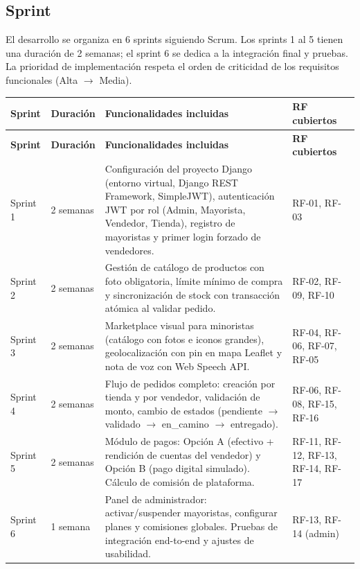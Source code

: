 \documentclass[12pt, a4paper]{article}
\begin{document}
\subsection{Sprint}

El desarrollo se organiza en 6 sprints siguiendo Scrum. Los sprints 1 al 5 tienen una duración de 2 semanas; el sprint 6 se dedica a la integración final y pruebas. La prioridad de implementación respeta el orden de criticidad de los requisitos funcionales (Alta $\rightarrow$ Media).

\begin{longtable}{|C{1.5cm}|C{2cm}|L{6.5cm}|L{2.5cm}|}
\hline
\textbf{Sprint} & \textbf{Duración} & \textbf{Funcionalidades incluidas} & \textbf{RF cubiertos} \\
\hline
\endfirsthead
\hline
\textbf{Sprint} & \textbf{Duración} & \textbf{Funcionalidades incluidas} & \textbf{RF cubiertos} \\
\hline
\endhead
Sprint 1 & 2 semanas & Configuración del proyecto Django (entorno virtual, Django REST Framework, SimpleJWT), autenticación JWT por rol (Admin, Mayorista, Vendedor, Tienda), registro de mayoristas y primer login forzado de vendedores. & RF-01, RF-03 \\ \hline
Sprint 2 & 2 semanas & Gestión de catálogo de productos con foto obligatoria, límite mínimo de compra y sincronización de stock con transacción atómica al validar pedido. & RF-02, RF-09, RF-10 \\ \hline
Sprint 3 & 2 semanas & Marketplace visual para minoristas (catálogo con fotos e iconos grandes), geolocalización con pin en mapa Leaflet y nota de voz con Web Speech API. & RF-04, RF-06, RF-07, RF-05 \\ \hline
Sprint 4 & 2 semanas & Flujo de pedidos completo: creación por tienda y por vendedor, validación de monto, cambio de estados (pendiente $\rightarrow$ validado $\rightarrow$ en\_camino $\rightarrow$ entregado). & RF-06, RF-08, RF-15, RF-16 \\ \hline
Sprint 5 & 2 semanas & Módulo de pagos: Opción A (efectivo + rendición de cuentas del vendedor) y Opción B (pago digital simulado). Cálculo de comisión de plataforma. & RF-11, RF-12, RF-13, RF-14, RF-17 \\ \hline
Sprint 6 & 1 semana & Panel de administrador: activar/suspender mayoristas, configurar planes y comisiones globales. Pruebas de integración end-to-end y ajustes de usabilidad. & RF-13, RF-14 (admin) \\ \hline
\end{longtable}
\end{document}
